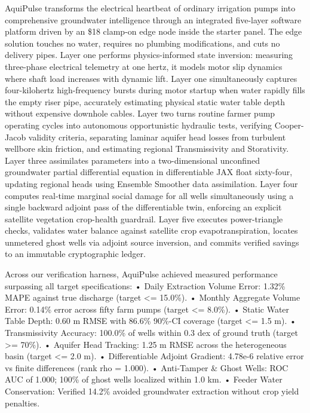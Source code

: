 \documentclass[10pt,a4paper]{article}
\begin{document}
AquiPulse transforms the electrical heartbeat of ordinary irrigation pumps into comprehensive groundwater intelligence through an integrated five-layer software platform driven by an \$18 clamp-on edge node inside the starter panel. The edge solution touches no water, requires no plumbing modifications, and cuts no delivery pipes. Layer one performs physics-informed state inversion: measuring three-phase electrical telemetry at one hertz, it models motor slip dynamics where shaft load increases with dynamic lift. Layer one simultaneously captures four-kilohertz high-frequency bursts during motor startup when water rapidly fills the empty riser pipe, accurately estimating physical static water table depth without expensive downhole cables. Layer two turns routine farmer pump operating cycles into autonomous opportunistic hydraulic tests, verifying Cooper-Jacob validity criteria, separating laminar aquifer head losses from turbulent wellbore skin friction, and estimating regional Transmissivity and Storativity. Layer three assimilates parameters into a two-dimensional unconfined groundwater partial differential equation in differentiable JAX float sixty-four, updating regional heads using Ensemble Smoother data assimilation. Layer four computes real-time marginal social damage for all wells simultaneously using a single backward adjoint pass of the differentiable twin, enforcing an explicit satellite vegetation crop-health guardrail. Layer five executes power-triangle checks, validates water balance against satellite crop evapotranspiration, locates unmetered ghost wells via adjoint source inversion, and commits verified savings to an immutable cryptographic ledger.

Across our verification harness, AquiPulse achieved measured performance surpassing all target specifications:
• Daily Extraction Volume Error: 1.32\% MAPE against true discharge (target <= 15.0\%).
• Monthly Aggregate Volume Error: 0.14\% error across fifty farm pumps (target <= 8.0\%).
• Static Water Table Depth: 0.60 m RMSE with 86.6\% 90\%-CI coverage (target <= 1.5 m).
• Transmissivity Accuracy: 100.0\% of wells within 0.3 dex of ground truth (target >= 70\%).
• Aquifer Head Tracking: 1.25 m RMSE across the heterogeneous basin (target <= 2.0 m).
• Differentiable Adjoint Gradient: 4.78e-6 relative error vs finite differences (rank rho = 1.000).
• Anti-Tamper \& Ghost Wells: ROC AUC of 1.000; 100\% of ghost wells localized within 1.0 km.
• Feeder Water Conservation: Verified 14.2\% avoided groundwater extraction without crop yield penalties.
\end{document}
